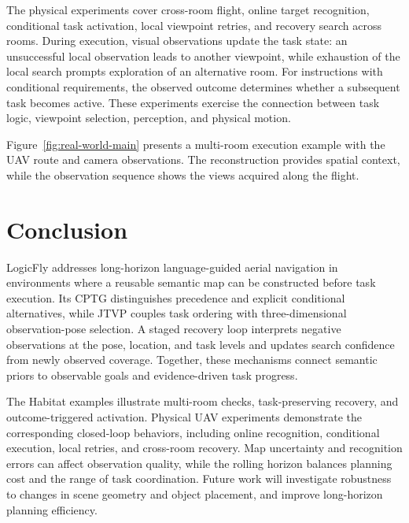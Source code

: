 \documentclass[letterpaper,10pt,journal]{IEEEtran}
\begin{document}
The physical experiments cover cross-room flight, online target recognition, conditional task activation, local viewpoint retries, and recovery search across rooms. During execution, visual observations update the task state: an unsuccessful local observation leads to another viewpoint, while exhaustion of the local search prompts exploration of an alternative room. For instructions with conditional requirements, the observed outcome determines whether a subsequent task becomes active. These experiments exercise the connection between task logic, viewpoint selection, perception, and physical motion.

Figure~\ref{fig:real-world-main} presents a multi-room execution example with the UAV route and camera observations. The reconstruction provides spatial context, while the observation sequence shows the views acquired along the flight.

\section{Conclusion}
LogicFly addresses long-horizon language-guided aerial navigation in environments where a reusable semantic map can be constructed before task execution. Its CPTG distinguishes precedence and explicit conditional alternatives, while JTVP couples task ordering with three-dimensional observation-pose selection. A staged recovery loop interprets negative observations at the pose, location, and task levels and updates search confidence from newly observed coverage. Together, these mechanisms connect semantic priors to observable goals and evidence-driven task progress.

The Habitat examples illustrate multi-room checks, task-preserving recovery, and outcome-triggered activation. Physical UAV experiments demonstrate the corresponding closed-loop behaviors, including online recognition, conditional execution, local retries, and cross-room recovery. Map uncertainty and recognition errors can affect observation quality, while the rolling horizon balances planning cost and the range of task coordination. Future work will investigate robustness to changes in scene geometry and object placement, and improve long-horizon planning efficiency.


\end{document}
